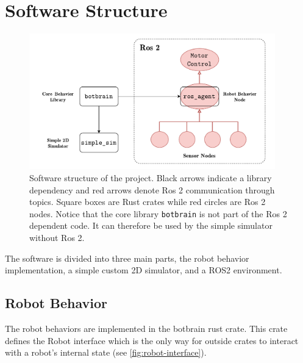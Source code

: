 \section{Software Structure}
\begin{figure}
    \begin{center}
        \includegraphics[width=0.95\textwidth]{figures/software-structure.pdf}
    \end{center}
    \caption{Software structure of the project. Black arrows indicate a library dependency and red arrows denote Ros 2 communication through topics. Square boxes are Rust crates while red circles are Ros 2 nodes. Notice that the core library \texttt{botbrain} is not part of the Ros 2 dependent code. It can therefore be used by the simple simulator without Ros 2.}\label{fig:}
\end{figure}


The software is divided into three main parts, the robot behavior implementation, a simple custom 2D
simulator, and a ROS2 environment.

\subsection{Robot Behavior}
The robot behaviors are implemented in the botbrain rust crate. This crate defines the Robot interface
which is the only way for outside crates to interact with a robot’s internal state (see \cref{fig:robot-interface}).

